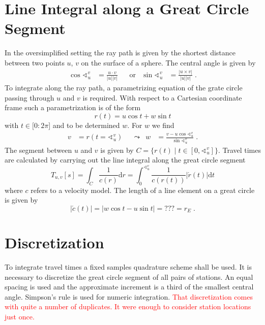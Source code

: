 \documentclass[11pt]{article}
\newcommand\worries[1]{\textcolor{red}{#1}}
\begin{document}
\section{Line Integral along a Great Circle Segment}
In the oversimplified setting the ray path is given by the shortest distance between two points $u$, $v$ on the surface of a sphere.
The central angle is given by
\begin{align}
    \cos \sphericalangle_u^v &= \frac{u \cdot v}{|u||v|} &
    &\text{or}&
    \sin \sphericalangle_u^v &= \frac{|u \times v|}{|u||v|}
    \; .
\end{align}
To integrate along the ray path, a parametrizing equation of the grate circle passing through $u$ and $v$ is required.
With respect to a Cartesian coordinate frame such a parametrization is of the form
\begin{equation}
    r(t) = u \cos t + w \sin t
\end{equation}
with $t \in [0:2\pi$] and to be determined $w$.
For $w$ we find
\begin{align}
    v &= r(t = \sphericalangle_u^v) &
    &\leadsto &
    w &= \frac{v - u \cos \sphericalangle_u^v}{\sin \sphericalangle_u^v}
    \; .
\end{align}
The segment between $u$ and $v$ is given by $C= \{r(t) \mid t \in [0, \sphericalangle_u^v]\}$.
Travel times are calculated by carrying out the line integral along the great circle segment
\begin{equation}
    T_{u,v}[s]
    = \int_C \frac1{c(r)} \mathrm d r
    = \int_0^{\sphericalangle_u^v} \frac 1{c(r(t))} |\acute r(t)| \mathrm d t
\end{equation}
where $c$ refers to a velocity model.
The length of a line element on a great circle is given by
\begin{equation}
    |\acute c(t)| = |w \cos t - u \sin t| = ??? = r_E
    \; .
\end{equation}

\section{Discretization}

To integrate travel times a fixed samples quadrature scheme shall be used.
It is necessary to discretize the great circle segment of all pairs of stations.
An equal spacing is used and the approximate increment is a third of the smallest central angle.
Simpson's rule is used for numeric integration.
\worries{That discretization comes with quite a number of duplicates.
It were enough to consider station locations just once.}
\end{document}
